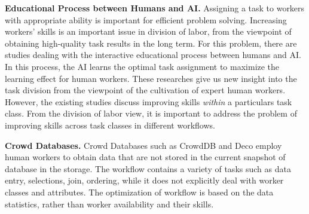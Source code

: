 \noindent
{\bf Educational Process between Humans and AI.}
Assigning a task to workers with appropriate ability is important for efficient problem solving.
Increasing workers' skills is an important issue in division of labor,  from the viewpoint of obtaining high-quality task results in the long term.
For this problem, there are studies dealing with the interactive educational process between humans and AI.
In this process, the AI learns the optimal task assignment to maximize the learning effect for human workers.
These researches give us new insight into the task division from the viewpoint of the cultivation of expert human workers.
However, the existing studies discuss improving skills {\it within} a particulars task class. 
From the division of labor view, it is important to address the problem of  improving skills across task classes in different workflows.  

\noindent
{\bf Crowd Databases.}
Crowd Databases such as CrowdDB\cite{FKK+11} and Deco\cite{PPG+12} employ human workers to obtain data that are not stored in the current snapshot of database in the  storage.
The workflow contains a variety of tasks such as data entry, selections, join, ordering, while it does not explicitly deal with worker classes and attributes. The optimization of workflow is based on the data statistics, rather than worker availability and their skills. 






